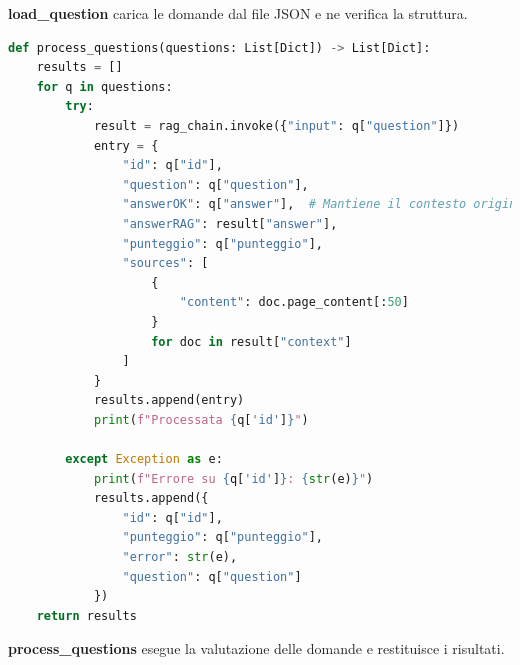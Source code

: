\documentclass[12pt,a4paper,openright,twoside]{book}
\begin{document}
\textbf{load\_question} carica le domande dal file JSON e ne verifica la struttura.
\begin{lstlisting}[language=Python, caption={Funzione:process\_questions}, label={lst:process_questions}]
def process_questions(questions: List[Dict]) -> List[Dict]:
    results = []
    for q in questions:
        try:
            result = rag_chain.invoke({"input": q["question"]})
            entry = {
                "id": q["id"],
                "question": q["question"],
                "answerOK": q["answer"],  # Mantiene il contesto originale
                "answerRAG": result["answer"],
                "punteggio": q["punteggio"],
                "sources": [
                    {
                        "content": doc.page_content[:50]
                    } 
                    for doc in result["context"]
                ]
            }
            results.append(entry)
            print(f"Processata {q['id']}")
            
        except Exception as e:
            print(f"Errore su {q['id']}: {str(e)}")
            results.append({
                "id": q["id"],
                "punteggio": q["punteggio"],
                "error": str(e),
                "question": q["question"]
            })
    return results
\end{lstlisting}
\textbf{process\_questions} esegue la valutazione delle domande e restituisce i risultati.
\end{document}
